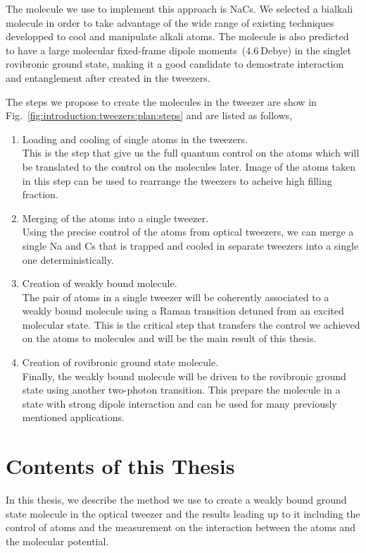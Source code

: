 The molecule we use to implement this approach is NaCs.
We selected a bialkali molecule in order to take advantage of
the wide range of existing techniques developped to cool and manipulate alkali atoms.
The molecule is also predicted to have a large
molecular fixed-frame dipole moments~($4.6~\mathrm{Debye}$)
in the singlet rovibronic ground state,
making it a good candidate to demostrate interaction and entanglement
after created in the tweezers.

The steps we propose to create the molecules in the tweezer are show in
Fig.~\ref{fig:introduction:tweezers:plan:steps} and are listed as follows,
\begin{enumerate}
\item Loading and cooling of single atoms in the tweezers.\\
  This is the step that give us the full quantum control on the atoms
  which will be translated to the control on the molecules later.
  Image of the atoms taken in this step can be used to rearrange the tweezers
  to acheive high filling fraction.
\item Merging of the atoms into a single tweezer.\\
  Using the precise control of the atoms from optical tweezers,
  we can merge a single Na and Cs that is trapped and cooled in separate tweezers
  into a single one deterministically.
\item Creation of weakly bound molecule.\\
  The pair of atoms in a single tweezer will be coherently associated
  to a weakly bound molecule using a Raman transition detuned from an excited molecular state.
  This is the critical step that transfers the control we achieved
  on the atoms to molecules and will be the main result of this thesis.
\item Creation of rovibronic ground state molecule.\\
  Finally, the weakly bound molecule will be driven to the rovibronic ground state
  using another two-photon transition.
  This prepare the molecule in a state with strong dipole interaction
  and can be used for many previously mentioned applications.
\end{enumerate}

\section{Contents of this Thesis}
\label{ch:introduction:contents}

In this thesis, we describe the method we use to create a weakly bound ground state molecule
in the optical tweezer and the results leading up to it including the control of atoms
and the measurement on the interaction between the atoms and the molecular potential.

